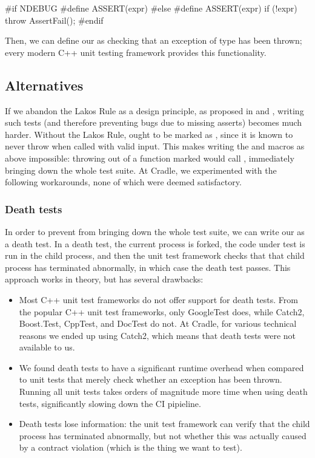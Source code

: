 \begin{codeblock}
#if NDEBUG
  #define ASSERT(expr)
#else
  #define ASSERT(expr) if (!expr) throw AssertFail();
#endif
\end{codeblock}
Then, we can define our  as checking that an exception of type  has been thrown; every modern C++ unit testing framework provides this functionality.

\subsection{Alternatives}

If we abandon the Lakos Rule as a design principle, as proposed in \cite{P1656R2} and \cite{P2148R0}, writing such tests (and therefore preventing bugs due to missing asserts) becomes much harder. Without the Lakos Rule,  ought to be marked as , since it is known to never throw when called with valid input. This makes writing the  and  macros as above impossible: throwing  out of a function marked  would call , immediately bringing down the whole test suite. At Cradle, we experimented with the following workarounds, none of which were deemed satisfactory.

\subsubsection{Death tests}

In order to prevent  from bringing down the whole test suite, we can write our  as a death test. In a death test, the current process is forked, the code under test is run in the child process, and then the unit test framework checks that that child process has terminated abnormally, in which case the death test passes. This approach works in theory, but has several drawbacks:

\begin{itemize}
\item Most C++ unit test frameworks do not offer support for death tests. From the popular C++ unit test frameworks, only GoogleTest does, while Catch2, Boost.Test, CppTest, and DocTest do not. At Cradle, for various technical reasons we ended up using Catch2, which means that death tests were not available to us.
\item We found death tests to have a significant runtime overhead when compared to unit tests that merely check whether an exception has been thrown. Running all unit tests takes orders of magnitude more time when using death tests, significantly slowing down the CI pipieline.
\item Death tests lose information: the unit test framework can verify that the child process has terminated abnormally, but not whether this was actually caused by a contract violation (which is the thing we want to test).
\end{itemize}

